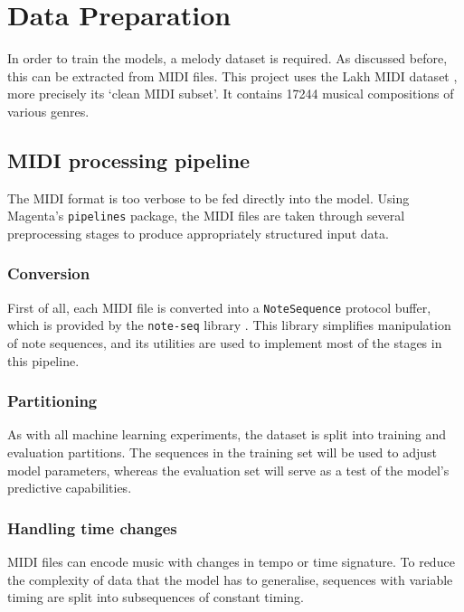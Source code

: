 \documentclass[../../report.tex]{subfiles}
\begin{document}
\section{Data Preparation}

In order to train the models, a melody dataset is required. As discussed before,
this can be extracted from MIDI files. This project uses the Lakh MIDI dataset
\cite{Raffel2016}, more precisely its `clean MIDI subset'. It contains
\num{17244} musical compositions of various genres.

\subsection{MIDI processing pipeline}

The MIDI format is too verbose to be fed directly into the model. Using
Magenta's \texttt{pipelines} package, the MIDI files are taken through several
preprocessing stages to produce appropriately structured input data.

\subsubsection{Conversion}

First of all, each MIDI file is converted into a \texttt{NoteSequence} protocol
buffer\footnotemark{}, which is provided by the \texttt{note-seq} library
\cite{NoteSeq}. This library simplifies manipulation of note sequences, and its
utilities are used to implement most of the stages in this pipeline.


\subsubsection{Partitioning}

As with all machine learning experiments, the dataset is split into training and
evaluation partitions. The sequences in the training set will be used to adjust
model parameters, whereas the evaluation set will serve as a test of the model's
predictive capabilities.

\subsubsection{Handling time changes}

MIDI files can encode music with changes in tempo or time signature. To reduce
the complexity of data that the model has to generalise, sequences with variable
timing are split into subsequences of constant timing.
\end{document}
